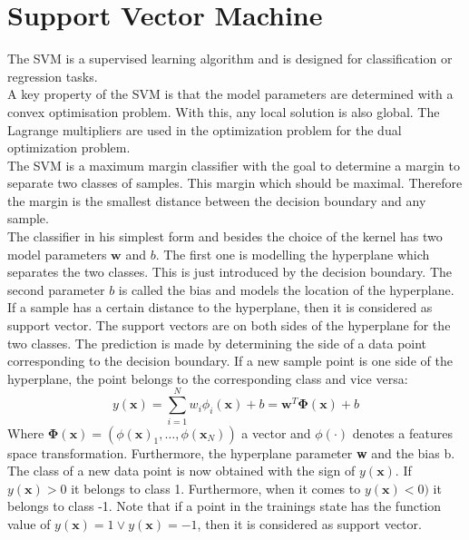 \section{Support Vector Machine}\label{PcSecSVM}
The \ac{SVM} is a supervised learning algorithm and is designed for classification or regression tasks.\cite[p. 325]{Bishop.2009}\\
A key property of the \acs{SVM} is that the model parameters are determined with a convex optimisation problem.
With this, any local solution is also global.
The Lagrange multipliers are used in the optimization problem for the dual optimization problem.\cite[p. 328-239]{Bishop.2009}\\
The \acs{SVM} is a maximum margin classifier with the goal to determine a margin to separate two classes of samples. This margin which should be maximal. 
Therefore the margin is the smallest distance between the decision boundary and any sample.\cite[p. 327]{Bishop.2009}\\
The classifier in his simplest form and besides the choice of the kernel has two model parameters $\mathbf{w}$ and $b$. 
The first one is modelling the hyperplane which separates the two classes.
This is just introduced by the decision boundary. 
The second parameter $b$ is called the bias and models the location of the hyperplane.\cite[p. 327-328]{Bishop.2009}\\
If a sample has a certain distance to the hyperplane, then it is considered as support vector.
The support vectors are on both sides of the hyperplane for the two classes.
The prediction is made by determining the side of a data point corresponding to the decision boundary.
If a new sample point is one side of the hyperplane, the point belongs to the corresponding class and vice versa:\cite[p. 236;328]{Bishop.2009}
\begin{equation}\label{EqSVMPred}
y(\textbf{x}) = \sum_{i=1}^{N} w_i \phi_i(\mathbf{x}) + b= \textbf{w}^T \mathbf{\Phi}(\textbf{x}) + b
\end{equation}
Where $\mathbf{\Phi(x)}= (\phi(\mathbf{x})_1,\dots,\phi(\mathbf{x}_N))$ a vector and $\phi(\cdot)$ denotes a features space transformation.
Furthermore, the hyperplane parameter \textbf{w} and the bias b.
The class of a new data point is now obtained with the sign of $y(\textbf{x})$. If $y(\textbf{x}) > 0$ it belongs to class 1.
Furthermore, when it comes to $y(\textbf{x}) < 0)$ it belongs to class -1.
Note that if a point in the trainings state has the function value of $y(\textbf{x}) = 1 \vee y(\textbf{x}) = -1$, then it is considered as support vector.\cite[p. 237]{Bishop.2009}\\
